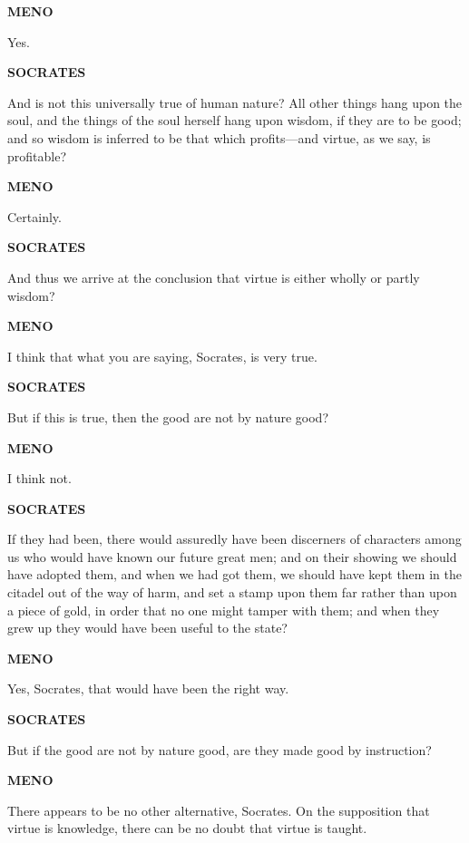 \documentclass[11pt,letter]{article}
\begin{document}
\par \textbf{MENO}
\par   Yes.

\par \textbf{SOCRATES}
\par   And is not this universally true of human nature? All other things hang upon the soul, and the things of the soul herself hang upon wisdom, if they are to be good; and so wisdom is inferred to be that which profits—and virtue, as we say, is profitable?

\par \textbf{MENO}
\par   Certainly.

\par \textbf{SOCRATES}
\par   And thus we arrive at the conclusion that virtue is either wholly or partly wisdom?

\par \textbf{MENO}
\par   I think that what you are saying, Socrates, is very true.

\par \textbf{SOCRATES}
\par   But if this is true, then the good are not by nature good?

\par \textbf{MENO}
\par   I think not.

\par \textbf{SOCRATES}
\par   If they had been, there would assuredly have been discerners of characters among us who would have known our future great men; and on their showing we should have adopted them, and when we had got them, we should have kept them in the citadel out of the way of harm, and set a stamp upon them far rather than upon a piece of gold, in order that no one might tamper with them; and when they grew up they would have been useful to the state?

\par \textbf{MENO}
\par   Yes, Socrates, that would have been the right way.

\par \textbf{SOCRATES}
\par   But if the good are not by nature good, are they made good by instruction?

\par \textbf{MENO}
\par   There appears to be no other alternative, Socrates. On the supposition that virtue is knowledge, there can be no doubt that virtue is taught.
\end{document}
